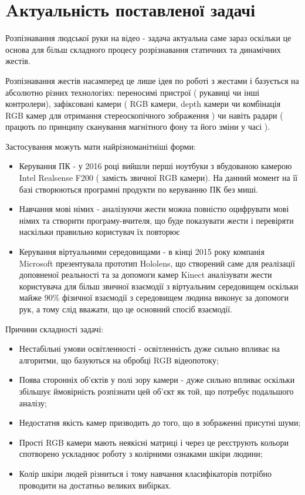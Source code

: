 \section{Aктуальність поставленої задачі}

Розпізнавання людської руки на відео - задача актуальна саме зараз оскільки це основа для більш складного процесу розрізнавання статичних та динамічних жестів. 

Розпізнавання жестів насамперед це лише ідея по роботі з жестами і базується на абсолютно різних технологіях: переносимі пристрої ( рукавиці чи інші контролери), зафіксовані камери ( RGB камери, depth камери чи комбінація RGB камер для отримання стереоскопічного зображення ) чи навіть радари ( працють по принципу сканування магнітного фону та його зміни у часі ).

Застосування можуть мати найрізноманітніші форми:
\begin{itemize}
	\item Керування ПК - у 2016 році вийшли перші ноутбуки з вбудованою камерою Intel Realsense F200 ( замість звичної RGB камери). На данний момент на її базі створюються програмні продукти по керуванню ПК без миші.
	\item Навчання мові німих - аналізуючи жести можна повністю оцифрувати мові німих та створити програму-вчителя, що буде показувати жести і перевіряти наскільки правильно користувач їх повторює
	\item Керування віртуальними середовищами - в кінці 2015 року компанія Microsoft презентувала прототип Hololens, що створений саме для реалізації доповненої реальності та за допомоги камер Kinect аналізувати жести користувача для більш звичної взаємодії з віртуальним середовищем оскільки майже 90\% фізичної взаємодії з середовищем людина виконує за допомоги рук, а тому слід вважати, що це основний спосіб взаємодії. 
\end{itemize}

Причини складності задачі:
\begin{itemize}
	\item Нестабільні умови освітленності - освітленність дуже сильно впливає на алгоритми, що базуються на обробці RGB відеопотоку;
	\item Поява сторонніх об'єктів у полі зору камери - дуже сильно впливає оскільки збільшує ймовірність розпізнати цей об'єкт як той, що потребує подальшого аналізу;
	\item Недостатня якість камер призводить до того, що в зображенні присутні шуми;
	\item Прості RGB камери мають неякісні матриці і через це реєструють кольори спотворено ускладнює роботу з колірними ознаками шкіри людини;
	\item Колір шкіри людей різниться і тому навчання класифікаторів потрібно проводити на достатньо великих вибірках.	 
\end{itemize}

